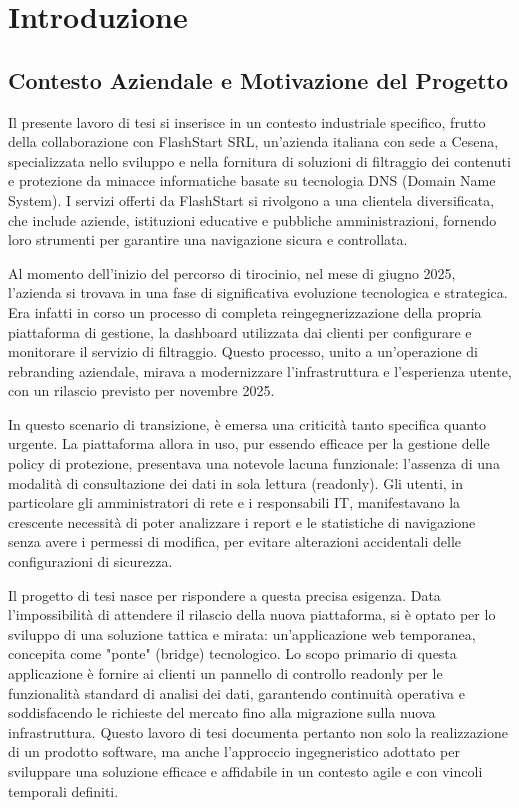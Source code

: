 \documentclass[12pt,a4paper,openright,twoside]{book}
\begin{document}
\mainmatter

\chapter{Introduzione}
\label{chap:introduzione}

\section{Contesto Aziendale e Motivazione del Progetto}
\label{sec:contesto_e_motivazione}

Il presente lavoro di tesi si inserisce in un contesto industriale specifico, frutto della collaborazione con FlashStart SRL, un'azienda italiana con sede a Cesena, specializzata nello sviluppo e nella fornitura di soluzioni di filtraggio dei contenuti e protezione da minacce informatiche basate su tecnologia DNS (Domain Name System). I servizi offerti da FlashStart si rivolgono a una clientela diversificata, che include aziende, istituzioni educative e pubbliche amministrazioni, fornendo loro strumenti per garantire una navigazione sicura e controllata.

Al momento dell'inizio del percorso di tirocinio, nel mese di giugno 2025, l'azienda si trovava in una fase di significativa evoluzione tecnologica e strategica. Era infatti in corso un processo di completa reingegnerizzazione della propria piattaforma di gestione, la dashboard utilizzata dai clienti per configurare e monitorare il servizio di filtraggio. Questo processo, unito a un'operazione di rebranding aziendale, mirava a modernizzare l'infrastruttura e l'esperienza utente, con un rilascio previsto per novembre 2025.

In questo scenario di transizione, è emersa una criticità tanto specifica quanto urgente. La piattaforma allora in uso, pur essendo efficace per la gestione delle policy di protezione, presentava una notevole lacuna funzionale: l'assenza di una modalità di consultazione dei dati in sola lettura (readonly). Gli utenti, in particolare gli amministratori di rete e i responsabili IT, manifestavano la crescente necessità di poter analizzare i report e le statistiche di navigazione senza avere i permessi di modifica, per evitare alterazioni accidentali delle configurazioni di sicurezza.

Il progetto di tesi nasce per rispondere a questa precisa esigenza. Data l'impossibilità di attendere il rilascio della nuova piattaforma, si è optato per lo sviluppo di una soluzione tattica e mirata: un'applicazione web temporanea, concepita come "ponte" (bridge) tecnologico. Lo scopo primario di questa applicazione è fornire ai clienti un pannello di controllo readonly per le funzionalità standard di analisi dei dati, garantendo continuità operativa e soddisfacendo le richieste del mercato fino alla migrazione sulla nuova infrastruttura. Questo lavoro di tesi documenta pertanto non solo la realizzazione di un prodotto software, ma anche l'approccio ingegneristico adottato per sviluppare una soluzione efficace e affidabile in un contesto agile e con vincoli temporali definiti.
\end{document}
